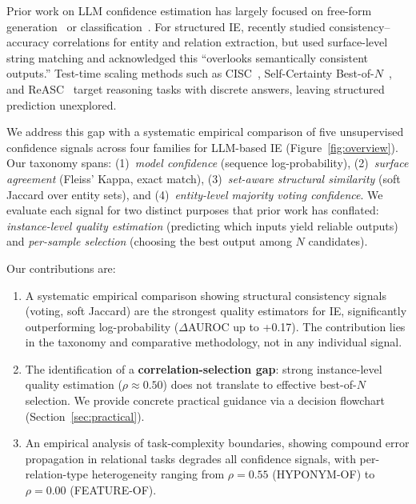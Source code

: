 \documentclass[11pt,a4paper]{article}
\begin{document}
Prior work on LLM confidence estimation has largely focused on free-form generation~\cite{kuhn2023semantic,manakul2023selfcheckgpt,kadavath2022language} or classification~\cite{guo2017calibration,desai2020calibration}.
For structured IE, \citet{nédellec2026consistency} recently studied consistency--accuracy correlations for entity and relation extraction, but used surface-level string matching and acknowledged this ``overlooks semantically consistent outputs.''
Test-time scaling methods such as CISC~\cite{huang2025cisc}, Self-Certainty Best-of-$N$~\cite{zhang2026selfcertainty}, and ReASC~\cite{li2026reasc} target reasoning tasks with discrete answers, leaving structured prediction unexplored.

We address this gap with a systematic empirical comparison of five unsupervised confidence signals across four families for LLM-based IE (Figure~\ref{fig:overview}).
Our taxonomy spans: (1)~\emph{model confidence} (sequence log-probability), (2)~\emph{surface agreement} (Fleiss' Kappa, exact match), (3)~\emph{set-aware structural similarity} (soft Jaccard over entity sets), and (4)~\emph{entity-level majority voting confidence}.
We evaluate each signal for two distinct purposes that prior work has conflated: \emph{instance-level quality estimation} (predicting which inputs yield reliable outputs) and \emph{per-sample selection} (choosing the best output among $N$ candidates).

Our contributions are:
\begin{enumerate}
\item A systematic empirical comparison showing structural consistency signals (voting, soft Jaccard) are the strongest quality estimators for IE, significantly outperforming log-probability ($\Delta$AUROC up to +0.17).
    The contribution lies in the taxonomy and comparative methodology, not in any individual signal.
\item The identification of a \textbf{correlation-selection gap}: strong instance-level quality estimation ($\rho{\approx}0.50$) does not translate to effective best-of-$N$ selection.
    We provide concrete practical guidance via a decision flowchart (Section~\ref{sec:practical}).
\item An empirical analysis of task-complexity boundaries, showing compound error propagation in relational tasks degrades all confidence signals, with per-relation-type heterogeneity ranging from $\rho{=}0.55$ (HYPONYM-OF) to $\rho{=}0.00$ (FEATURE-OF).
\end{enumerate}
\end{document}
